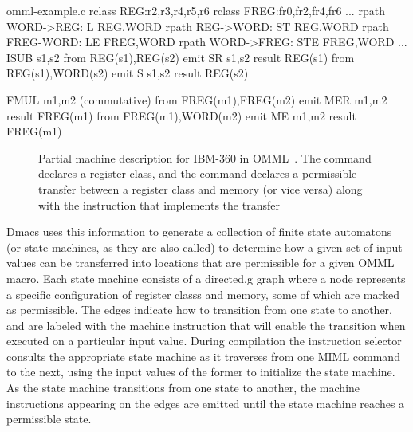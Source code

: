 \begin{filecontents*}{omml-example.c}
rclass REG:r2,r3,r4,r5,r6
rclass FREG:fr0,fr2,fr4,fr6
...
rpath WORD->REG: L REG,WORD
rpath REG->WORD: ST REG,WORD
rpath FREG-WORD: LE FREG,WORD
rpath WORD->FREG: STE FREG,WORD
...
ISUB s1,s2
from REG(s1),REG(s2) emit SR s1,s2  result REG(s1)
from REG(s1),WORD(s2) emit S s1,s2  result REG(s2)

FMUL m1,m2 (commutative)
from FREG(m1),FREG(m2) emit MER m1,m2  result FREG(m1)
from FREG(m1),WORD(m2) emit ME m1,m2   result FREG(m1)
\end{filecontents*}
%
\begin{figure}%
  \centering%
  \begin{lstpage}{95mm}%
  \end{lstpage}

  \caption[OMML example]%
          {%
            Partial machine description for IBM-360 in OMML~\cite{Miller:1971}.
            The  command declares a register class, and the
             command declares a permissible transfer between a
            register class and memory (or vice versa) along with the instruction
            that implements the transfer%
          }
\end{figure}

\gls{Dmacs} uses this information to generate a collection of \glspl{finite
  state automaton} (or \glspl{state machine}, as they are also called) to
determine how a given set of input values can be transferred into locations that
are permissible for a given \gls{OMML} \gls{macro}.
%
Each \gls{state machine} consists of a \gls{directed.g} \gls{graph} where a
\gls{node} represents a specific configuration of \glspl{register class} and
memory, some of which are marked as permissible.
%
The edges indicate how to transition from one state to another, and are labeled
with the machine instruction that will enable the transition when executed on a
particular input value.
%
During compilation the \gls{instruction selector} consults the appropriate
\gls{state machine} as it traverses from one \gls{MIML} command to the next,
using the input values of the former to initialize the \gls{state machine}.
%
As the \gls{state machine} transitions from one state to another, the machine
instructions appearing on the edges are emitted until the \gls{state machine}
reaches a permissible state.

